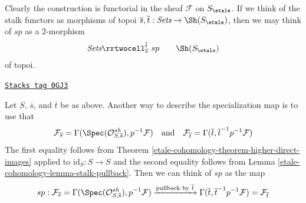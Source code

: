\medskip\noindent
Clearly the construction is functorial in the sheaf $\mathcal{F}$ on
$S_\etale$. If we think of the stalk functors as morphisms of topoi
$\overline{s}, \overline{t} : \textit{Sets} \to \Sh(S_\etale)$, then
we may think of $sp$ as a $2$-morphism
$$
\begin{array}{ccc}\textit{Sets}
\rrtwocell^{\overline{t}}_{\overline{s}}{\ sp} &  & \Sh(S_\etale)\end{array}
$$
of topoi.

\begin{remark}

\label{etale-cohomology-remark-alternative-sp}
\href{https://stacks.math.columbia.edu/tag/0GJ3}{\texttt{Stacks tag 0GJ3}}

Let $S$, $\overline{s}$, and $\overline{t}$ be as above.
Another way to describe the specialization map is to use that
$$
\mathcal{F}_{\overline{s}} =
\Gamma(\Spec(\mathcal{O}^{sh}_{S, \overline{s}}), p^{-1}\mathcal{F})
\quad\text{and}\quad
\mathcal{F}_{\overline{t}} = \Gamma(\overline{t},
\overline{t}^{-1}p^{-1}\mathcal{F})
$$
The first equality follows from Theorem \ref{etale-cohomology-theorem-higher-direct-images}
applied to $\text{id}_S : S \to S$ and the second equality follows
from Lemma \ref{etale-cohomology-lemma-stalk-pullback}. Then we can think of $sp$
as the map
$$
sp :
\mathcal{F}_{\overline{s}} =
\Gamma(\Spec(\mathcal{O}^{sh}_{S, \overline{s}}), p^{-1}\mathcal{F})
\xrightarrow{\text{pullback by }\overline{t}}
\Gamma(\overline{t}, \overline{t}^{-1}p^{-1}\mathcal{F}) =
\mathcal{F}_{\overline{t}}
$$
\end{remark}

